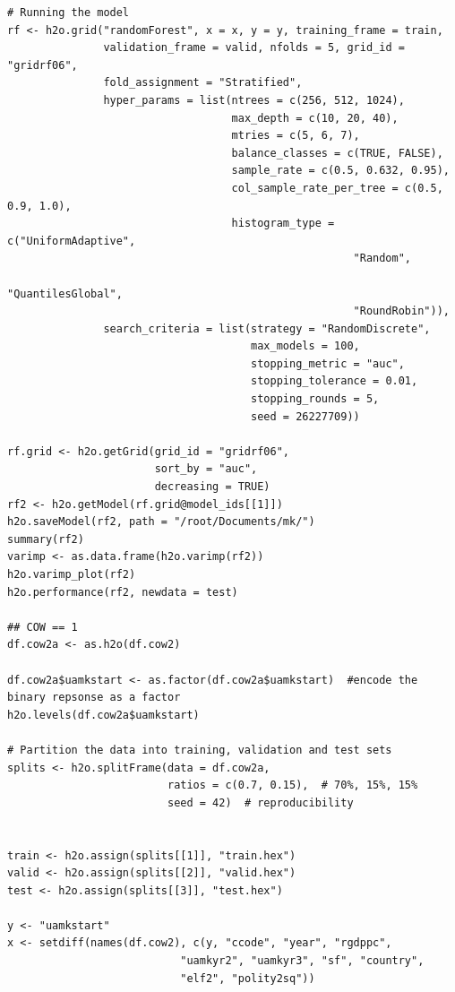 \documentclass[a4paper,12pt]{article}
\begin{document}
\begin{verbatim}
# Running the model
rf <- h2o.grid("randomForest", x = x, y = y, training_frame = train, 
               validation_frame = valid, nfolds = 5, grid_id = "gridrf06",
               fold_assignment = "Stratified",
               hyper_params = list(ntrees = c(256, 512, 1024),
                                   max_depth = c(10, 20, 40),
                                   mtries = c(5, 6, 7),
                                   balance_classes = c(TRUE, FALSE),
                                   sample_rate = c(0.5, 0.632, 0.95),
                                   col_sample_rate_per_tree = c(0.5, 0.9, 1.0),
                                   histogram_type = c("UniformAdaptive",
                                                      "Random",
                                                      "QuantilesGlobal",
                                                      "RoundRobin")),
               search_criteria = list(strategy = "RandomDiscrete", 
                                      max_models = 100, 
                                      stopping_metric = "auc", 
                                      stopping_tolerance = 0.01, 
                                      stopping_rounds = 5, 
                                      seed = 26227709)) 

rf.grid <- h2o.getGrid(grid_id = "gridrf06",
                       sort_by = "auc",
                       decreasing = TRUE)
rf2 <- h2o.getModel(rf.grid@model_ids[[1]])
h2o.saveModel(rf2, path = "/root/Documents/mk/")
summary(rf2)
varimp <- as.data.frame(h2o.varimp(rf2))
h2o.varimp_plot(rf2)
h2o.performance(rf2, newdata = test)

## COW == 1
df.cow2a <- as.h2o(df.cow2)

df.cow2a$uamkstart <- as.factor(df.cow2a$uamkstart)  #encode the binary repsonse as a factor
h2o.levels(df.cow2a$uamkstart)

# Partition the data into training, validation and test sets
splits <- h2o.splitFrame(data = df.cow2a, 
                         ratios = c(0.7, 0.15),  # 70%, 15%, 15%
                         seed = 42)  # reproducibility


train <- h2o.assign(splits[[1]], "train.hex")   
valid <- h2o.assign(splits[[2]], "valid.hex") 
test <- h2o.assign(splits[[3]], "test.hex")

y <- "uamkstart"
x <- setdiff(names(df.cow2), c(y, "ccode", "year", "rgdppc",
                           "uamkyr2", "uamkyr3", "sf", "country",
                           "elf2", "polity2sq")) 


\end{verbatim}
\end{document}

